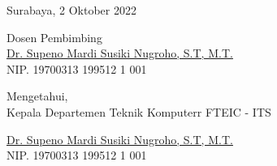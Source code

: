 \begin{flushright}
  Surabaya, 2 Oktober 2022
\end{flushright}
\vspace{1ex}

\begin{center}







  Dosen Pembimbing \\
  \vspace{12ex}
  \underline{Dr. Supeno Mardi Susiki Nugroho, S.T, M.T.} \\
  NIP. 19700313 199512 1 001

  \vspace{6ex}

  Mengetahui, \\
  Kepala Departemen Teknik Komputerr FTEIC - ITS
  \vspace{12ex}

  \underline{Dr. Supeno Mardi Susiki Nugroho, S.T, M.T.} \\
  NIP. 19700313 199512 1 001

\end{center}
